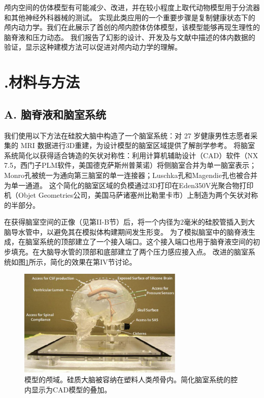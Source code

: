\documentclass[12pt]{article}
\begin{document}
颅内空间的仿体模型有可能减少、改进，并在较小程度上取代动物模型用于分流器和其他神经外科器械的测试。
实现此类应用的一个重要步骤是复制健康状态下的颅内动力学。我们在此展示了首创的颅内腔体仿体模型，该模型能够再现生理性的脑脊液和压力动态。
我们报告了幻影的设计、开发及与文献中描述的体内数据的验证，显示这种建模方法可以促进对颅内动力学的理解。

\section*{\uppercase\expandafter{}.材料与方法}

\subsection*{A. 脑脊液和脑室系统}
我们使用以下方法在硅胶大脑中构造了一个脑室系统：对 27 岁健康男性志愿者采集的 MRI 数据进行3D重建，为设计模型的脑室区域提供了解剖学参考。
将脑室系统简化以获得适合铸造的矢状对称性：利用计算机辅助设计（CAD）软件（NX 7.5，西门子PLM软件，美国德克萨斯州普莱诺）将侧脑室合并为单一脑室表示；Monro孔被统一为通向第三脑室的单一连接器；Luschka孔和Magendie孔也被合并为单一通道。
这个简化的脑室区域的负模通过3D打印在Eden350V光聚合物打印机（Objet Geometries公司，美国马萨诸塞州比勒里卡市）上制造为两个矢状对称的半部分。

在获得脑室空间的正像（见第II-B节）后，将一个内径为2毫米的硅胶管插入到大脑导水管中，以避免其在模拟体构建期间发生形变。
为了模拟脑室中的脑脊液生成，在脑室系统的顶部建立了一个接入端口。这个接入端口也用于脑脊液空间的初步填充。在大脑导水管的顶部和底部建立了两个压力感应接入点。
改进的脑室系统如图\ref{fig:ventricular_system}所示，简化的效果在第IV节讨论。
\begin{figure}[h]
    \centering
    \includegraphics[width=0.7\textwidth]{Figures/1.png}
    \caption{模型的颅域。硅质大脑被容纳在塑料人类颅骨内。简化脑室系统的腔内显示为CAD模型的叠加。}
    \label{fig:ventricular_system}
\end{figure}
\end{document}
